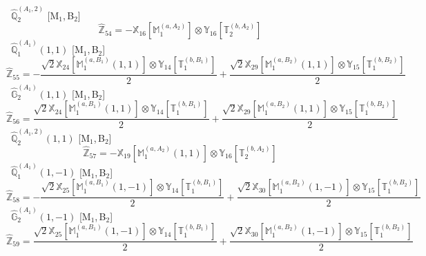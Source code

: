 \documentclass[fleqn,10pt,landscape]{article}
\begin{document}
\begin{itemize}
\begin{dmath*}
\end{dmath*}
\vspace{4mm}
\noindent {} $\,\,\,\hat{\mathbb{Q}}_{2}^{(A_{1},2)}$ [M$_{1}$,\,B$_{2}$]
\begin{dmath*}
\hat{\mathbb{Z}}_{54}=- \mathbb{X}_{16}[\mathbb{M}_{1}^{(a,A_{2})}] \otimes\mathbb{Y}_{16}[\mathbb{T}_{2}^{(b,A_{2})}]
\end{dmath*}
\vspace{4mm}
\noindent {} $\,\,\,\hat{\mathbb{Q}}_{1}^{(A_{1})}(1,1)$ [M$_{1}$,\,B$_{2}$]
\begin{dmath*}
\hat{\mathbb{Z}}_{55}=- \frac{\sqrt{2} \mathbb{X}_{24}[\mathbb{M}_{1}^{(a,B_{1})}(1,1)] \otimes\mathbb{Y}_{14}[\mathbb{T}_{1}^{(b,B_{1})}]}{2} + \frac{\sqrt{2} \mathbb{X}_{29}[\mathbb{M}_{1}^{(a,B_{2})}(1,1)] \otimes\mathbb{Y}_{15}[\mathbb{T}_{1}^{(b,B_{2})}]}{2}
\end{dmath*}
\vspace{4mm}
\noindent {} $\,\,\,\hat{\mathbb{G}}_{2}^{(A_{1})}(1,1)$ [M$_{1}$,\,B$_{2}$]
\begin{dmath*}
\hat{\mathbb{Z}}_{56}=\frac{\sqrt{2} \mathbb{X}_{24}[\mathbb{M}_{1}^{(a,B_{1})}(1,1)] \otimes\mathbb{Y}_{14}[\mathbb{T}_{1}^{(b,B_{1})}]}{2} + \frac{\sqrt{2} \mathbb{X}_{29}[\mathbb{M}_{1}^{(a,B_{2})}(1,1)] \otimes\mathbb{Y}_{15}[\mathbb{T}_{1}^{(b,B_{2})}]}{2}
\end{dmath*}
\vspace{4mm}
\noindent {} $\,\,\,\hat{\mathbb{Q}}_{2}^{(A_{1},2)}(1,1)$ [M$_{1}$,\,B$_{2}$]
\begin{dmath*}
\hat{\mathbb{Z}}_{57}=- \mathbb{X}_{19}[\mathbb{M}_{1}^{(a,A_{2})}(1,1)] \otimes\mathbb{Y}_{16}[\mathbb{T}_{2}^{(b,A_{2})}]
\end{dmath*}
\vspace{4mm}
\noindent {} $\,\,\,\hat{\mathbb{Q}}_{1}^{(A_{1})}(1,-1)$ [M$_{1}$,\,B$_{2}$]
\begin{dmath*}
\hat{\mathbb{Z}}_{58}=- \frac{\sqrt{2} \mathbb{X}_{25}[\mathbb{M}_{1}^{(a,B_{1})}(1,-1)] \otimes\mathbb{Y}_{14}[\mathbb{T}_{1}^{(b,B_{1})}]}{2} + \frac{\sqrt{2} \mathbb{X}_{30}[\mathbb{M}_{1}^{(a,B_{2})}(1,-1)] \otimes\mathbb{Y}_{15}[\mathbb{T}_{1}^{(b,B_{2})}]}{2}
\end{dmath*}
\vspace{4mm}
\noindent {} $\,\,\,\hat{\mathbb{G}}_{2}^{(A_{1})}(1,-1)$ [M$_{1}$,\,B$_{2}$]
\begin{dmath*}
\hat{\mathbb{Z}}_{59}=\frac{\sqrt{2} \mathbb{X}_{25}[\mathbb{M}_{1}^{(a,B_{1})}(1,-1)] \otimes\mathbb{Y}_{14}[\mathbb{T}_{1}^{(b,B_{1})}]}{2} + \frac{\sqrt{2} \mathbb{X}_{30}[\mathbb{M}_{1}^{(a,B_{2})}(1,-1)] \otimes\mathbb{Y}_{15}[\mathbb{T}_{1}^{(b,B_{2})}]}{2}

\end{dmath*}
\end{itemize}
\end{document}
